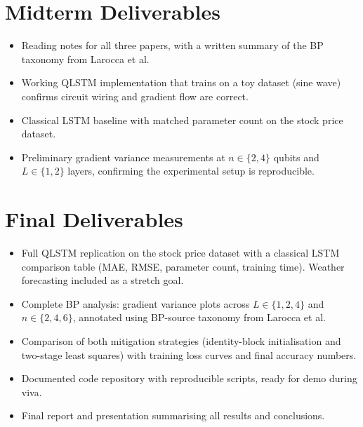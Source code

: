 \documentclass[10pt,twocolumn]{article}
\begin{document}
\section{Midterm Deliverables}

\begin{itemize}
  \item Reading notes for all three papers, with a written summary of the BP taxonomy from Larocca et al.
  \item Working QLSTM implementation that trains on a toy dataset (sine wave) confirms circuit wiring and gradient flow are correct.
  \item Classical LSTM baseline with matched parameter count on the stock price dataset.
  \item Preliminary gradient variance measurements at $n \in \{2, 4\}$ qubits and $L \in \{1, 2\}$ layers, confirming the experimental setup is reproducible.
\end{itemize}


\section{Final Deliverables}

\begin{itemize}
  \item Full QLSTM replication on the stock price dataset with a classical LSTM comparison table (MAE, RMSE, parameter count, training time). Weather forecasting included as a stretch goal.
  \item Complete BP analysis: gradient variance plots across $L \in \{1,2,4\}$ and $n \in \{2,4,6\}$, annotated using BP-source taxonomy from Larocca et al.
  \item Comparison of both mitigation strategies (identity-block initialisation and two-stage least squares) with training loss curves and final accuracy numbers.
  \item Documented code repository with reproducible scripts, ready for demo during viva.
  \item Final report and presentation summarising all results and conclusions.
\end{itemize}
\end{document}
